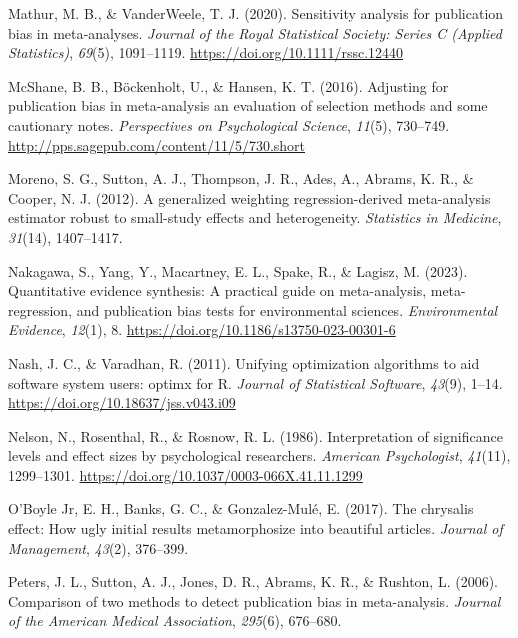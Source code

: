 \documentclass[
  man, donotrepeattitle,floatsintext]{apa7}
\newlength{\cslhangindent}
\newenvironment{CSLReferences}[2] %
 {\begin{list}{}{%
  \setlength{\itemindent}{0pt}
  \setlength{\leftmargin}{0pt}
  \setlength{\parsep}{0pt}
  \ifodd #1
   \setlength{\leftmargin}{\cslhangindent}
   \setlength{\itemindent}{-1\cslhangindent}
  \fi
  \setlength{\itemsep}{#2\baselineskip}}}
 {\end{list}}
\begin{document}
\begin{CSLReferences}{1}{0}
Mathur, M. B., \& VanderWeele, T. J. (2020). Sensitivity analysis for publication bias in meta‐analyses. \emph{Journal of the Royal Statistical Society: Series C (Applied Statistics)}, \emph{69}(5), 1091--1119. \url{https://doi.org/10.1111/rssc.12440}

McShane, B. B., Böckenholt, U., \& Hansen, K. T. (2016). Adjusting for publication bias in meta-analysis an evaluation of selection methods and some cautionary notes. \emph{Perspectives on Psychological Science}, \emph{11}(5), 730--749. \url{http://pps.sagepub.com/content/11/5/730.short}

Moreno, S. G., Sutton, A. J., Thompson, J. R., Ades, A., Abrams, K. R., \& Cooper, N. J. (2012). A generalized weighting regression-derived meta-analysis estimator robust to small-study effects and heterogeneity. \emph{Statistics in Medicine}, \emph{31}(14), 1407--1417.

Nakagawa, S., Yang, Y., Macartney, E. L., Spake, R., \& Lagisz, M. (2023). Quantitative evidence synthesis: A practical guide on meta-analysis, meta-regression, and publication bias tests for environmental sciences. \emph{Environmental Evidence}, \emph{12}(1), 8. \url{https://doi.org/10.1186/s13750-023-00301-6}

Nash, J. C., \& Varadhan, R. (2011). Unifying optimization algorithms to aid software system users: {optimx} for {R}. \emph{Journal of Statistical Software}, \emph{43}(9), 1--14. \url{https://doi.org/10.18637/jss.v043.i09}

Nelson, N., Rosenthal, R., \& Rosnow, R. L. (1986). Interpretation of significance levels and effect sizes by psychological researchers. \emph{American Psychologist}, \emph{41}(11), 1299--1301. \url{https://doi.org/10.1037/0003-066X.41.11.1299}

O'Boyle Jr, E. H., Banks, G. C., \& Gonzalez-Mulé, E. (2017). The chrysalis effect: How ugly initial results metamorphosize into beautiful articles. \emph{Journal of Management}, \emph{43}(2), 376--399.

Peters, J. L., Sutton, A. J., Jones, D. R., Abrams, K. R., \& Rushton, L. (2006). Comparison of two methods to detect publication bias in meta-analysis. \emph{Journal of the American Medical Association}, \emph{295}(6), 676--680.


\end{CSLReferences}
\end{document}
